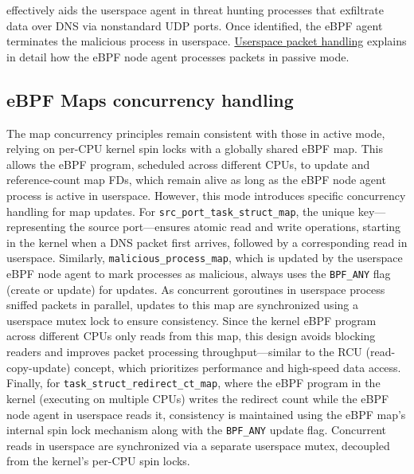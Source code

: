 \documentclass [11pt, proquest] {uwthesis}[2020/02/24]
\begin{document}
effectively aids the userspace agent in threat hunting processes that exfiltrate data over DNS via nonstandard UDP ports. Once identified, the eBPF agent terminates the malicious process in userspace. \hyperref[sec:alg6]{Userspace packet handling} explains in detail how the eBPF node agent processes packets in passive mode.

\subsection{\textbf{eBPF Maps concurrency handling}}
\label{passive:sec3}
The map concurrency principles remain consistent with those in active mode, relying on per-CPU kernel spin locks with a globally shared eBPF map. This allows the eBPF program, scheduled across different CPUs, to update and reference-count map FDs, which remain alive as long as the eBPF node agent process is active in userspace. However, this mode introduces specific concurrency handling for map updates. For \texttt{src\_port\_task\_struct\_map}, the unique key—representing the source port—ensures atomic read and write operations, starting in the kernel when a DNS packet first arrives, followed by a corresponding read in userspace. Similarly, \texttt{malicious\_process\_map}, which is updated by the userspace eBPF node agent to mark processes as malicious, always uses the \texttt{BPF\_ANY} flag (create or update) for updates. As concurrent goroutines in userspace process sniffed packets in parallel, updates to this map are synchronized using a userspace mutex lock to ensure consistency. Since the kernel eBPF program across different CPUs only reads from this map, this design avoids blocking readers and improves packet processing throughput—similar to the RCU (read-copy-update) concept, which prioritizes performance and high-speed data access. Finally, for \texttt{task\_struct\_redirect\_ct\_map}, where the eBPF program in the kernel (executing on multiple CPUs) writes the redirect count while the eBPF node agent in userspace reads it, consistency is maintained using the eBPF map’s internal spin lock mechanism along with the \texttt{BPF\_ANY} update flag. Concurrent reads in userspace are synchronized via a separate userspace mutex, decoupled from the kernel’s per-CPU spin locks.
\end{document}
